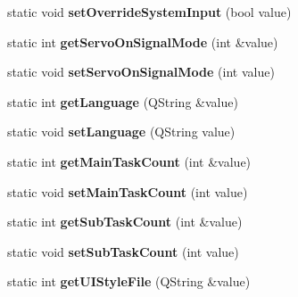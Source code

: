 \begin{DoxyCompactItemize}
\item 
\hypertarget{classAppConf_ad3737d05eed772a71012cb899f0c528f}{static void {\bfseries set\-Override\-System\-Input} (bool value)}\label{classAppConf_ad3737d05eed772a71012cb899f0c528f}

\item 
\hypertarget{classAppConf_ad0f330ff166928226362935295a2ac50}{static int {\bfseries get\-Servo\-On\-Signal\-Mode} (int \&value)}\label{classAppConf_ad0f330ff166928226362935295a2ac50}

\item 
\hypertarget{classAppConf_a0bb8d7d1b2ad629fe35629cf90ad52c2}{static void {\bfseries set\-Servo\-On\-Signal\-Mode} (int value)}\label{classAppConf_a0bb8d7d1b2ad629fe35629cf90ad52c2}

\item 
\hypertarget{classAppConf_ab6d5dbe880c68270abaf46d2389d5a2e}{static int {\bfseries get\-Language} (Q\-String \&value)}\label{classAppConf_ab6d5dbe880c68270abaf46d2389d5a2e}

\item 
\hypertarget{classAppConf_a71d445ef9e737908fdbc32b5ee6ad518}{static void {\bfseries set\-Language} (Q\-String value)}\label{classAppConf_a71d445ef9e737908fdbc32b5ee6ad518}

\item 
\hypertarget{classAppConf_a715acc959af2d870b7b7930680badf52}{static int {\bfseries get\-Main\-Task\-Count} (int \&value)}\label{classAppConf_a715acc959af2d870b7b7930680badf52}

\item 
\hypertarget{classAppConf_a234c63e183a55a220893d322958861a8}{static void {\bfseries set\-Main\-Task\-Count} (int value)}\label{classAppConf_a234c63e183a55a220893d322958861a8}

\item 
\hypertarget{classAppConf_a7df130d9ac701b3a6dd12de79c52f536}{static int {\bfseries get\-Sub\-Task\-Count} (int \&value)}\label{classAppConf_a7df130d9ac701b3a6dd12de79c52f536}

\item 
\hypertarget{classAppConf_a19885d0f9ffad99535ce82ba191bcd4f}{static void {\bfseries set\-Sub\-Task\-Count} (int value)}\label{classAppConf_a19885d0f9ffad99535ce82ba191bcd4f}

\item 
\hypertarget{classAppConf_acf727a784e45cdbdfe75a30aa0c62a50}{static int {\bfseries get\-U\-I\-Style\-File} (Q\-String \&value)}\label{classAppConf_acf727a784e45cdbdfe75a30aa0c62a50}


\end{DoxyCompactItemize}
